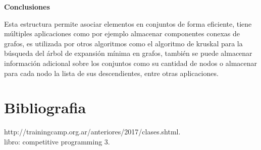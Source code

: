 \documentclass[12pt, a4paper]{article}
\newcommand{\subtitulo}[1]{\begin{center}\textbf{#1}\end{center}}
\begin{document}
	\subtitulo{Conclusiones}
	Esta estructura permite asociar elementos en conjuntos de forma eficiente, tiene múltiples aplicaciones como
	por ejemplo almacenar componentes conexas de grafos, es utilizada por otros algoritmos como el algoritmo de 
	kruskal para la búsqueda del árbol de expansión mínima en grafos, también se puede almacenar información
	adicional sobre los conjuntos como su cantidad de nodos o almacenar para cada nodo la lista de sus descendientes,
	entre otras aplicaciones.
	
	\section{Bibliografia}
	
	http://trainingcamp.org.ar/anteriores/2017/clases.shtml.\\ 
	libro: competitive programming 3.\\ 

	
\end{document}

